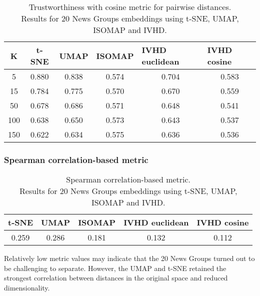 \documentclass[12pt]{article}
\begin{document}
\begin{table}[h]
\centering
\caption{Trustworthiness with cosine metric for pairwise distances. \\
Results for 20 News Groups embeddings using t-SNE, UMAP, ISOMAP and IVHD.}
\begin{tabular}{|c|c|c|c|c|c|}
\hline
\textbf{K} & \textbf{t-SNE} & \textbf{UMAP} & \multicolumn{1}{l|}{\textbf{ISOMAP}} & \multicolumn{1}{l|}{\textbf{IVHD euclidean}} & \multicolumn{1}{l|}{\textbf{IVHD cosine}} \\ \hline
5          & 0.880          & 0.838         & 0.574                                & 0.704                                        & 0.583                                     \\ \hline
15         & 0.784          & 0.775         & 0.570                                & 0.670                                        & 0.559                                     \\ \hline
50         & 0.678          & 0.686         & 0.571                                & 0.648                                        & 0.541                                     \\ \hline
100        & 0.638          & 0.650         & 0.573                                & 0.643                                        & 0.537                                     \\ \hline
150        & 0.622          & 0.634         & 0.575                                & 0.636                                        & 0.536                                     \\ \hline
\end{tabular}
\end{table}

\subsubsection{Spearman correlation-based metric}
\begin{table}[h]
\centering
\caption{Spearman correlation-based metric. \\ Results for 20 News Groups embeddings using t-SNE, UMAP, ISOMAP and IVHD.}
\begin{tabular}{|c|c|l|l|l|}
\hline
\textbf{t-SNE} & \textbf{UMAP} & \textbf{ISOMAP}            & \textbf{IVHD euclidean}    & \textbf{IVHD cosine}       \\ \hline
0.259          & 0.286         & \multicolumn{1}{c|}{0.181} & \multicolumn{1}{c|}{0.132} & \multicolumn{1}{c|}{0.112} \\ \hline
\end{tabular}
\end{table}
Relatively low metric values may indicate that the 20 News Groups turned out to be challenging to separate. However, the UMAP and t-SNE retained the strongest correlation between distances in the original space and reduced dimensionality.
\end{document}

